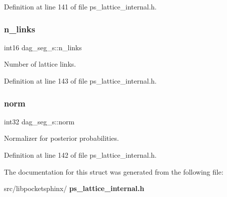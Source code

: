 Definition at line 141 of file ps\+\_\+lattice\+\_\+internal.\+h.

\mbox{\label{structdag__seg__s_a2a858ea6ef051074be2bd1716a4939fb}} 
\subsubsection{n\+\_\+links}
{\footnotesize\ttfamily int16 dag\+\_\+seg\+\_\+s\+::n\+\_\+links}



Number of lattice links. 



Definition at line 143 of file ps\+\_\+lattice\+\_\+internal.\+h.

\mbox{\label{structdag__seg__s_a4517656eeaa40d33109d39a251a75dea}} 
\subsubsection{norm}
{\footnotesize\ttfamily int32 dag\+\_\+seg\+\_\+s\+::norm}



Normalizer for posterior probabilities. 



Definition at line 142 of file ps\+\_\+lattice\+\_\+internal.\+h.



The documentation for this struct was generated from the following file\+:\begin{DoxyCompactItemize}
\item 
src/libpocketsphinx/\textbf{ ps\+\_\+lattice\+\_\+internal.\+h}\end{DoxyCompactItemize}
